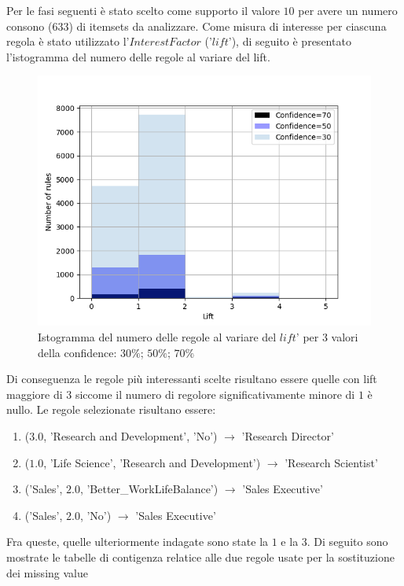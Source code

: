 \documentclass[a4paper,9pt]{article}
\begin{document}
Per le fasi seguenti è stato scelto come supporto il valore $10$ per avere un numero consono ($633$) di itemsets da analizzare.
Come misura di interesse per ciascuna regola è stato utilizzato l'$Interest Factor$ ('$lift$'), di seguito è presentato l'istogramma del numero delle regole al variare del lift.  

\begin{figure}[H]
    \centering
    \includegraphics[scale=0.70]{lifthistogram.png}
    \caption{Istogramma del numero delle regole al variare del $lift$' per $3$ valori della confidence: $30\%$; $50\%$; $70\%$}
    \label{fig:my_label}
\end{figure}

Di conseguenza le regole più interessanti scelte risultano essere quelle con lift maggiore di $3$ siccome il numero di regolore significativamente  minore di $1$ è nullo. Le regole selezionate risultano essere:

\begin{enumerate}
\item ($3.0$, 'Research and Development', 'No') $\longrightarrow$ 'Research Director'
\item ($1.0$, 'Life Science', 'Research and Development') $\longrightarrow$ 'Research Scientist'
\item ('Sales', $2.0$, 'Better\_WorkLifeBalance') $\longrightarrow$ 'Sales Executive'
\item ('Sales', $2.0$, 'No') $\longrightarrow$ 'Sales Executive'
\end{enumerate}

Fra queste, quelle ulteriormente indagate sono state la $1$ e la $3$.
Di seguito sono mostrate le tabelle di contigenza relatice alle due regole usate per la sostituzione dei missing value
\end{document}
